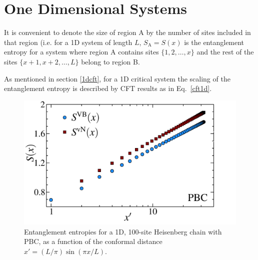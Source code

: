 \section{One Dimensional Systems}


It is convenient to denote the size of region A by the number of sites included in that region 
(i.e. for a 1D system of length $L$, $S_{\text{A}} = S(x)$ is the entanglement entropy for a system where region A contains sites $\{1,2,\dots,x\}$ and the rest of the sites $\{x+1,x+2,\dots,L\}$
belong to region B.

As mentioned in section \ref{1dcft}, for a 1D critical system the scaling of the entanglement entropy is described by CFT results as in Eq.~\eqref{cft1d}. 

\begin{figure} {
\includegraphics[width=5.5in]{./figures/paper1/figure1/thesis_pbc.pdf} 
\centering
\caption[1D PBC Results for \vb with \vn]{
Entanglement entropies for a 1D, 100-site Heisenberg chain with PBC, as a function of the conformal distance $x'  = (L/\pi)\sin (\pi x/L)$.
\label{1dPBC}}
} 
\end{figure}

